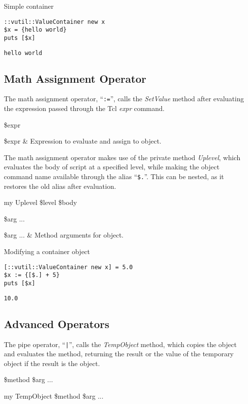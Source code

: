 \documentclass{article}
\begin{document}
\begin{example}{Simple container}
\begin{lstlisting}
::vutil::ValueContainer new x
$x = {hello world}
puts [$x]
\end{lstlisting}
\tcblower
\begin{lstlisting}
hello world
\end{lstlisting}
\end{example}

\clearpage
\subsection{Math Assignment Operator}
The math assignment operator, ``\texttt{:=}'', calls the \textit{SetValue} method after evaluating the expression passed through the Tcl \textit{expr} command.
\begin{syntax}
 \$expr
\end{syntax}
\begin{args}
\$expr & Expression to evaluate and assign to object.
\end{args}

The math assignment operator makes use of the private method \textit{Uplevel}, which evaluates the body of script at a specified level, while making the object command name available through the alias ``\texttt{\$.}''. This can be nested, as it restores the old alias after evaluation.
\begin{syntax}
my Uplevel \$level \$body
\end{syntax}

\begin{syntax}
 \$arg ...
\end{syntax}
\begin{args}
\$arg ... & Method arguments for object.
\end{args}

\begin{example}{Modifying a container object}
\begin{lstlisting}
[::vutil::ValueContainer new x] = 5.0
$x := {[$.] + 5}
puts [$x]
\end{lstlisting}
\tcblower
\begin{lstlisting}
10.0
\end{lstlisting}
\end{example}

\clearpage
\subsection{Advanced Operators}
The pipe operator, ``\texttt{|}'', calls the \textit{TempObject} method, which copies the object and evaluates the method, returning the result or the value of the temporary object if the result is the object.
\begin{syntax}
 \$method \$arg ... 
\end{syntax}
\begin{syntax}
my TempObject \$method \$arg ...
\end{syntax}
\end{document}
